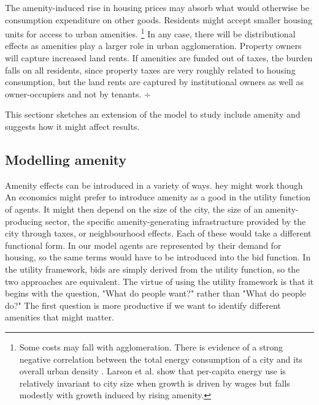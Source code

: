 The amenity-induced rise in housing prices may absorb what would otherwise be consumption expenditure on other goods. Residents might accept smaller housing units for access to urban amenities. \footnote{Some costs may fall with agglomeration. There is evidence of a strong negative correlation between the total energy consumption of a city and its overall urban density \cite{NewmanPeterJeffrey}. Larson et al. \cite{larsonEnergyImplicationsCity2015} show that per-capita energy use is relatively invariant to city size when growth is driven by wages but falls modestly with growth induced by rising amenity.} In any case, there will be distributional effects as amenities play a larger role in urban agglomeration. Property owners will capture increased land rents. If amenities are funded out of taxes, the burden falls on all residents, since property taxes are very roughly related to housing consumption, but the land rents are captured by institutional owners as well as owner-occupiers and not by tenants.
÷

 This sectionr sketches an extension of the model to study include \gls{amenity} and suggests how it might affect results. 

 
\subsection{Modelling amenity}
Amenity effects can be introduced in a variety of ways. hey might work though An economics might prefer to introduce amenity as a good in the utility function of agents. It might then depend on the size of the city, the size of an amenity-producing sector, the specific amenity-generating infrastructure provided by the city through taxes,  or neighbourhood effects. Each of these would take a different functional form. In our model agents are represented by their demand for housing, so the same terms would have to be introduced into the bid function. In the utility framework, bids are simply derived from the utility function, so the two approaches are equivalent. The virtue of using the utility framework is that it begins with the question, "What do people want?" rather than "What do people do?" The first question is more productive if we want to identify different amenities that might matter.

